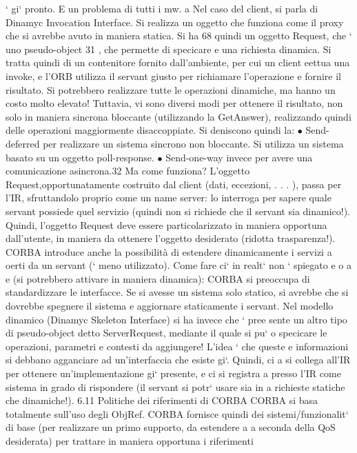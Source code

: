 \documentclass[a4paper,12pt]{article}
\begin{document}
`
gi` pronto. E un problema di tutti i mw.
a
Nel caso del client, si parla di Dinamyc Invocation Interface. Si realizza un
oggetto che funziona come il proxy che si avrebbe avuto in maniera statica. Si ha
68
quindi un oggetto Request, che ` uno pseudo-object 31 , che permette di specicare
e
una richiesta dinamica. Si tratta quindi di un contenitore fornito dall'ambiente,
per cui un client eettua una invoke, e l'ORB utilizza il servant giusto per
richiamare l'operazione e fornire il risultato. Si potrebbero realizzare tutte le
operazioni dinamiche, ma hanno un costo molto elevato! Tuttavia, vi sono
diversi modi per ottenere il risultato, non solo in maniera sincrona bloccante
(utilizzando la GetAnswer), realizzando quindi delle operazioni maggiormente
disaccoppiate. Si deniscono quindi la:
$\bullet$ Send-deferred per realizzare un sistema sincrono non bloccante. Si utilizza
un sistema basato su un oggetto poll-response.
$\bullet$ Send-one-way invece per avere una comunicazione asincrona.32
Ma come funziona? L'oggetto Request,opportunatamente costruito dal client
(dati, eccezioni, . . . ), passa per l'IR, sfruttandolo proprio come un name server: lo interroga per sapere quale
servant possiede quel servizio (quindi non si
richiede che il servant sia dinamico!). Quindi, l'oggetto Request deve essere particolarizzato in maniera opportuna
dall'utente, in maniera da ottenere l'oggetto
desiderato (ridotta trasparenza!).
CORBA introduce anche la possibilità di estendere dinamicamente i servizi
a
oerti da un servant (` meno utilizzato). Come fare ci` in realt` non ` spiegato
e
o
a
e
(si potrebbero attivare in maniera dinamica): CORBA si preoccupa di standardizzare le interfacce. Se si avesse un
sistema solo statico, si avrebbe che si
dovrebbe spegnere il sistema e aggiornare staticamente i servant.
Nel modello dinamico (Dinamyc Skeleton Interface) si ha invece che ` pree
sente un altro tipo di pseudo-object detto ServerRequest, mediante il quale si pu`
o
specicare le operazioni, parametri e contesti da aggiungere! L'idea ` che queste
e
informazioni si debbano agganciare ad un'interfaccia che esiste gi`. Quindi, ci
a
si collega all'IR per ottenere un'implementazione gi` presente, e ci si registra
a
presso l'IR come sistema in grado di rispondere (il servant si potr` usare sia in
a
richieste statiche che dinamiche!).
6.11
Politiche dei riferimenti di CORBA
CORBA si basa totalmente sull'uso degli ObjRef. CORBA fornisce quindi dei
sistemi/funzionalit` di base (per realizzare un primo supporto, da estendere a
a
seconda della QoS desiderata) per trattare in maniera opportuna i riferimenti
\end{document}
